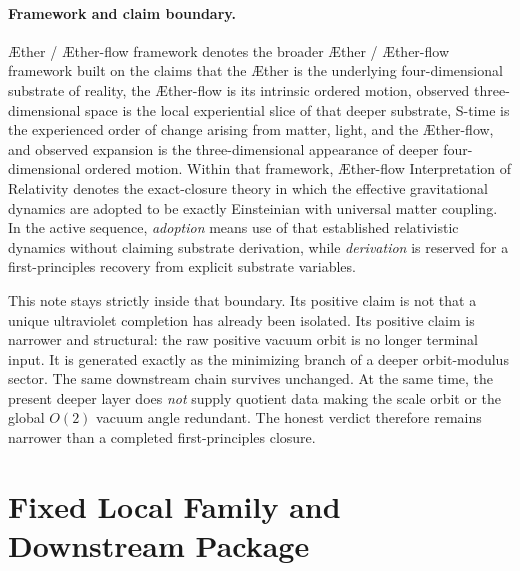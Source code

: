 \documentclass[11pt]{article}
\newcommand{\Aether}{\AE{}ther}
\newcommand{\Aflow}{\AE{}ther-flow}
\newcommand{\TheoryName}{\Aflow{} Interpretation of Relativity}
\newcommand{\TheoryProgram}{\Aether{} / \Aflow{} framework}
\begin{document}
\paragraph{Framework and claim boundary.}
\TheoryProgram{} denotes the broader \Aether{} / \Aflow{} framework built on the claims that the \Aether{} is the underlying four-dimensional substrate of reality, the \Aflow{} is its intrinsic ordered motion, observed three-dimensional space is the local experiential slice of that deeper substrate, S-time is the experienced order of change arising from matter, light, and the \Aflow{}, and observed expansion is the three-dimensional appearance of deeper four-dimensional ordered motion. Within that framework, \TheoryName{} denotes the exact-closure theory in which the effective gravitational dynamics are adopted to be exactly Einsteinian with universal matter coupling. In the active sequence, \emph{adoption} means use of that established relativistic dynamics without claiming substrate derivation, while \emph{derivation} is reserved for a first-principles recovery from explicit substrate variables.

This note stays strictly inside that boundary. Its positive claim is not that a unique ultraviolet completion has already been isolated. Its positive claim is narrower and structural: the raw positive vacuum orbit is no longer terminal input. It is generated exactly as the minimizing branch of a deeper orbit-modulus sector. The same downstream chain survives unchanged. At the same time, the present deeper layer does \emph{not} supply quotient data making the scale orbit or the global \(O(2)\) vacuum angle redundant. The honest verdict therefore remains narrower than a completed first-principles closure.

\section{Fixed Local Family and Downstream Package}
\end{document}
